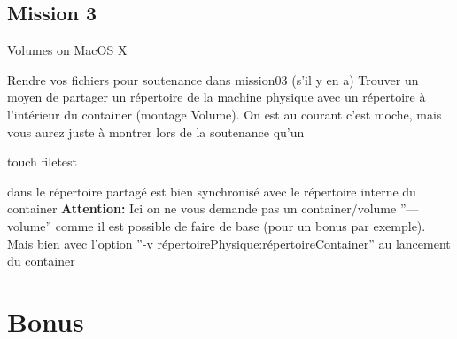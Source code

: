 \documentclass{42}
\begin{document}
	\newpage


\section{Mission 3}
\begin{center}
	{\Huge Volumes on MacOS X}
\end{center}

Rendre vos fichiers pour soutenance dans mission03 (s’il y en a)
\newline
\newline
Trouver un moyen de partager un répertoire de la machine physique avec un répertoire à l'intérieur du container (montage Volume).
On est au courant c’est moche, mais vous aurez juste à montrer lors de la soutenance qu’un
\begin{42ccode}
touch filetest
\end{42ccode}
dans le répertoire partagé est bien synchronisé avec le répertoire interne du container
\newline
\newline
\newline
\warn
{
\textbf{Attention:}
\newline
\newline
Ici on ne vous demande pas un container/volume ''---volume'' comme il est possible de faire de base (pour un bonus par exemple).
\newline
\newline
Mais bien avec l’option ''-v répertoirePhysique:répertoireContainer'' au lancement du container
}



\chapter{Bonus}
\end{document}
